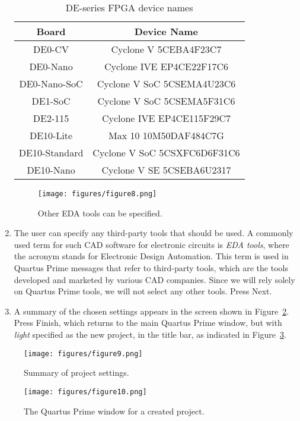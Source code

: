 \begin{enumerate}
\begin{table}[H]
	\begin{center}
	\begin{tabular}{| c | c |}
	\hline
	Board & Device Name \\
	\hline
	DE0-CV & Cyclone V 5CEBA4F23C7 \\
	\hline
	DE0-Nano & Cyclone IVE EP4CE22F17C6 \\
	\hline
	DE0-Nano-SoC & Cyclone V SoC 5CSEMA4U23C6\\
	\hline
	DE1-SoC & Cyclone V SoC 5CSEMA5F31C6 \\
	\hline
	DE2-115 & Cyclone IVE EP4CE115F29C7 \\
	\hline
	DE10-Lite & Max 10 10M50DAF484C7G \\
	\hline
	DE10-Standard & Cyclone V SoC 5CSXFC6D6F31C6 \\
	\hline
	DE10-Nano & Cyclone V SE 5CSEBA6U2317 \\
	\hline
	\end{tabular}
	\caption{DE-series FPGA device names}
	\label{tab:device}
	\end{center}
\end{table}

\begin{figure}[H]
   \begin{center}
      \texttt{[image: figures/figure8.png]}
   \caption{Other EDA tools can be specified.} 
	 \label{fig:8}
	 \end{center}
\end{figure}

\item The user can specify any third-party tools that should be used.
A commonly used term for such CAD software for electronic circuits
is {\it EDA tools}, where the acronym stands for Electronic Design Automation.
This term is used in Quartus Prime messages that refer to third-party tools, 
which are the tools developed and marketed by various CAD companies.
Since we will rely solely on Quartus Prime tools, we will not select 
any other tools.  Press {\sf Next}.
 
\item A summary of the chosen settings appears in the screen shown in Figure~\ref{fig:9}.
Press {\sf Finish}, which returns to the main Quartus Prime window, 
but with {\it light} specified as the new project,
in the title bar, as indicated in Figure~\ref{fig:10}.
\end{enumerate}

\begin{figure}[H]
   \begin{center}
      \texttt{[image: figures/figure9.png]}
   \caption{Summary of project settings.} 
	 \label{fig:9}
	 \end{center}
\end{figure}

\begin{figure}[H]
   \begin{center}
      \texttt{[image: figures/figure10.png]}
   \caption{The Quartus Prime window for a created project.} 
	 \label{fig:10}
	 \end{center}
\end{figure}
